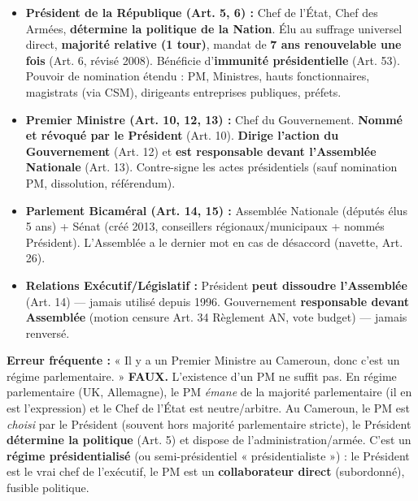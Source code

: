 \documentclass[11pt]{article}
\newcommand{\cle}[1]{{\popxbold\color{popdark}#1}}
\begin{document}
\begin{propriete}
\begin{itemize}
    \item \textbf{Président de la République (Art. 5, 6) :} Chef de l'État, Chef des Armées, \textbf{détermine la politique de la Nation}. Élu au suffrage universel direct, \textbf{majorité relative (1 tour)}, mandat de \textbf{7 ans renouvelable une fois} (Art. 6, révisé 2008). Bénéficie d'\textbf{immunité présidentielle} (Art. 53). Pouvoir de nomination étendu : PM, Ministres, hauts fonctionnaires, magistrats (via CSM), dirigeants entreprises publiques, préfets.
    \item \textbf{Premier Ministre (Art. 10, 12, 13) :} Chef du Gouvernement. \textbf{Nommé et révoqué par le Président} (Art. 10). \textbf{Dirige l'action du Gouvernement} (Art. 12) et \textbf{est responsable devant l'Assemblée Nationale} (Art. 13). Contre-signe les actes présidentiels (sauf nomination PM, dissolution, référendum).
    \item \textbf{Parlement Bicaméral (Art. 14, 15) :} Assemblée Nationale (députés élus 5 ans) + Sénat (créé 2013, conseillers régionaux/municipaux + nommés Président). L'Assemblée a le dernier mot en cas de désaccord (navette, Art. 26).
    \item \textbf{Relations Exécutif/Législatif :} Président \textbf{peut dissoudre l'Assemblée} (Art. 14) — jamais utilisé depuis 1996. Gouvernement \textbf{responsable devant Assemblée} (motion censure Art. 34 Règlement AN, vote budget) — jamais renversé.
\end{itemize}
\end{propriete}

\begin{attention}
\textbf{Erreur fréquente :} « Il y a un Premier Ministre au Cameroun, donc c'est un régime parlementaire. »
\textbf{FAUX.} L'existence d'un PM ne suffit pas. En régime parlementaire (UK, Allemagne), le PM \emph{émane} de la majorité parlementaire (il en est l'expression) et le Chef de l'État est neutre/arbitre. Au Cameroun, le PM est \emph{choisi} par le Président (souvent hors majorité parlementaire stricte), le Président \textbf{détermine la politique} (Art. 5) et dispose de l'administration/armée. C'est un \textbf{régime présidentialisé} (ou semi-présidentiel « présidentialiste ») : le Président est le \cle{vrai chef de l'exécutif}, le PM est un \textbf{collaborateur direct} (subordonné), fusible politique.
\end{attention}
\end{document}
